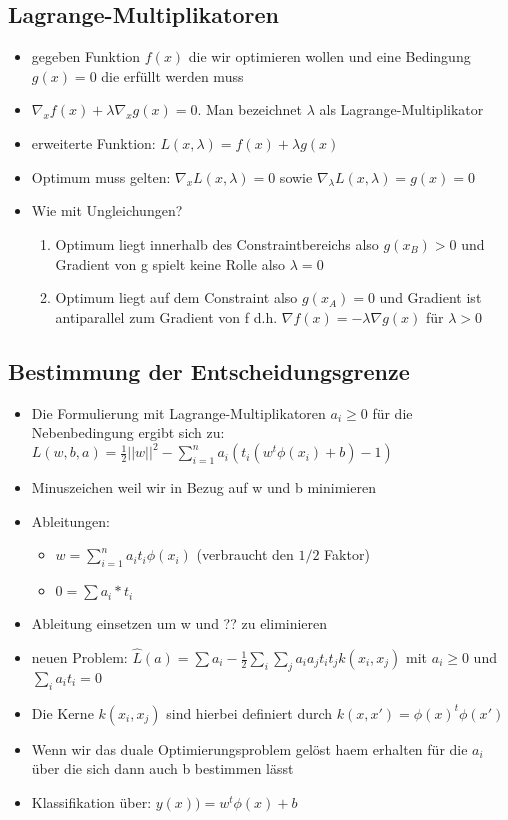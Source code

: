 \documentclass{article} %
\begin{document}
	\subsection{Lagrange-Multiplikatoren}
	\begin{itemize}
		\item gegeben Funktion $f(x)$ die wir optimieren wollen und eine Bedingung $g(x) = 0$ die erfüllt werden muss
		\item $\nabla_x f(x) + \lambda\nabla_x g(x) = 0$. Man bezeichnet $\lambda$ als Lagrange-Multiplikator
		\item erweiterte Funktion: $L(x,\lambda) = f(x) + \lambda g(x)$
		\item Optimum muss gelten: $\nabla_x L(x,\lambda) = 0$ sowie $\nabla_\lambda L(x,\lambda) = g(x) = 0$
		\item Wie mit Ungleichungen?
		\begin{enumerate}
			\item Optimum liegt innerhalb des Constraintbereichs also $g(x_B) > 0$ und Gradient von g spielt keine Rolle also $\lambda = 0$
			\item Optimum liegt auf dem Constraint also $g(x_A) = 0$ und Gradient ist antiparallel zum Gradient von f d.h. $\nabla f(x) = -\lambda\nabla g(x)$ für $\lambda > 0$
		\end{enumerate}
	\end{itemize}
	\subsection{Bestimmung der Entscheidungsgrenze}
	\begin{itemize}
		\item Die Formulierung mit Lagrange-Multiplikatoren $a_i \geq 0$ für die Nebenbedingung ergibt sich zu: $L(w,b,a) = \frac{1}{2}||w||^2 - \sum_{i=1}^{n}a_i (t_i(w^t\phi(x_i)+b)-1)$
		\item Minuszeichen weil wir in Bezug auf w und b minimieren
		\item Ableitungen:
		\begin{itemize}
			\item $w = \sum_{i=1}^{n} a_i t_i \phi(x_i)$ (verbraucht den $1/2$ Faktor)
			\item $0 = \sum a_i*t_i$
		\end{itemize}
		\item Ableitung einsetzen um w und ?? zu eliminieren
		\item neuen Problem: $\hat{L}(a) = \sum a_i - \frac{1}{2}\sum_i\sum_j a_ia_jt_it_jk(x_i,x_j)$ mit $a_i \geq 0$ und $\sum_i a_it_i = 0$
		\item Die Kerne $k(x_i,x_j)$ sind hierbei definiert durch $k(x,x') = \phi(x)^t\phi(x')$
		\item Wenn wir das duale Optimierungsproblem gelöst haem erhalten für die $a_i$ über die sich dann auch b bestimmen lässt
		\item Klassifikation über: $y(x) ) = w^t\phi(x)+b$
	\end{itemize}


\end{document}

